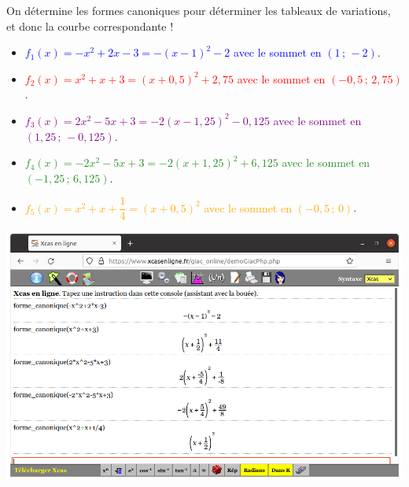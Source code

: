\documentclass[a4paper,11pt]{article}
\begin{document}
\begin{enumerate}
\begin{center}
	\end{center}
\end{enumerate}

\medskip


\medskip

On détermine les formes canoniques pour déterminer les tableaux de variations, et donc la courbe correspondante !
\begin{itemize}
	\item \textcolor{blue}{$f_1(x)=-x^2+2x-3=-(x-1)^2-2$ avec le sommet en $(1\,;\,-2)$}.
	\item \textcolor{red}{$f_2(x)=x^2+x+3=(x+0,5)^2+2,75$ avec le sommet en $(-0,5\,;\,2,75)$}.
	\item \textcolor{purple}{$f_3(x)=2x^2-5x+3=-2(x-1,25)^2-0,125$ avec le sommet en $(1,25\,;\,-0,125)$}.
	\item \textcolor{ForestGreen}{$f_4(x)=-2x^2-5x+3=-2(x+1,25)^2+6,125$  avec le sommet en $(-1,25\,;\,6,125)$}.
	\item \textcolor{orange}{$f_5(x)=x^2+x+\dfrac14=(x+0,5)^2$ avec le sommet en $(-0,5\,;\,0)$}.
\end{itemize}

\begin{center}
	\includegraphics[scale=0.3]{chap01_exos_corr_d}
\end{center}

\end{document}
